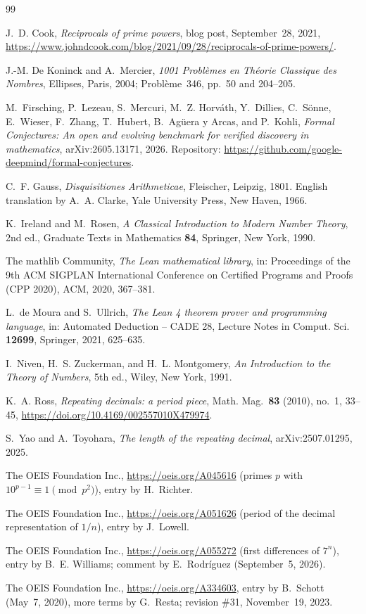 \documentclass[11pt]{amsart}
\theoremstyle{plain}
\theoremstyle{definition}
\begin{document}
{\small
\begin{thebibliography}{99}

J.~D. Cook, \emph{Reciprocals of prime powers}, blog post, September~28, 2021, \url{https://www.johndcook.com/blog/2021/09/28/reciprocals-of-prime-powers/}.

J.-M. De Koninck and A.~Mercier, \emph{1001 Probl\`emes en Th\'eorie Classique des Nombres}, Ellipses, Paris, 2004; Probl\`eme~346, pp.~50 and 204--205.

M.~Firsching, P.~Lezeau, S.~Mercuri, M.~Z. Horv\'ath, Y.~Dillies, C.~S\"onne, E.~Wieser, F.~Zhang, T.~Hubert, B.~Ag\"uera y Arcas, and P.~Kohli, \emph{Formal Conjectures: An open and evolving benchmark for verified discovery in mathematics}, arXiv:2605.13171, 2026. Repository: \url{https://github.com/google-deepmind/formal-conjectures}.

C.~F. Gauss, \emph{Disquisitiones Arithmeticae}, Fleischer, Leipzig, 1801. English translation by A.~A. Clarke, Yale University Press, New Haven, 1966.

K.~Ireland and M.~Rosen, \emph{A Classical Introduction to Modern Number Theory}, 2nd ed., Graduate Texts in Mathematics \textbf{84}, Springer, New York, 1990.

The mathlib Community, \emph{The Lean mathematical library}, in: Proceedings of the 9th ACM SIGPLAN International Conference on Certified Programs and Proofs (CPP 2020), ACM, 2020, 367--381.

L.~de Moura and S.~Ullrich, \emph{The Lean 4 theorem prover and programming language}, in: Automated Deduction -- CADE 28, Lecture Notes in Comput. Sci. \textbf{12699}, Springer, 2021, 625--635.

I.~Niven, H.~S. Zuckerman, and H.~L. Montgomery, \emph{An Introduction to the Theory of Numbers}, 5th ed., Wiley, New York, 1991.

K.~A. Ross, \emph{Repeating decimals: a period piece}, Math. Mag.\ \textbf{83} (2010), no.~1, 33--45, \url{https://doi.org/10.4169/002557010X479974}.

S.~Yao and A.~Toyohara, \emph{The length of the repeating decimal}, arXiv:2507.01295, 2025.

The OEIS Foundation Inc., \url{https://oeis.org/A045616} (primes $p$ with $10^{p-1}\equiv1\pmod{p^2}$), entry by H.~Richter.

The OEIS Foundation Inc., \url{https://oeis.org/A051626} (period of the decimal representation of $1/n$), entry by J.~Lowell.

The OEIS Foundation Inc., \url{https://oeis.org/A055272} (first differences of $7^n$), entry by B.~E. Williams; comment by E.~Rodr\'iguez (September~5, 2026).

The OEIS Foundation Inc., \url{https://oeis.org/A334603}, entry by B.~Schott (May~7, 2020), more terms by G.~Resta; revision \#31, November~19, 2023.

\end{thebibliography}
}
\end{document}
